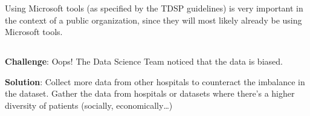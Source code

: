 Using Microsoft tools (as specified by the TDSP guidelines) is very important in the context of a public organization, since they will most likely already be using Microsoft tools.

\subsection*{}
\begin{warning}
    \textbf{Challenge}: Oops!
    The Data Science Team noticed that the data is biased.

    \textbf{Solution}: Collect more data from other hospitals to counteract the imbalance in the dataset.
    Gather the data from hospitals or datasets where there’s a higher diversity of patients (socially, economically…)


\end{warning}